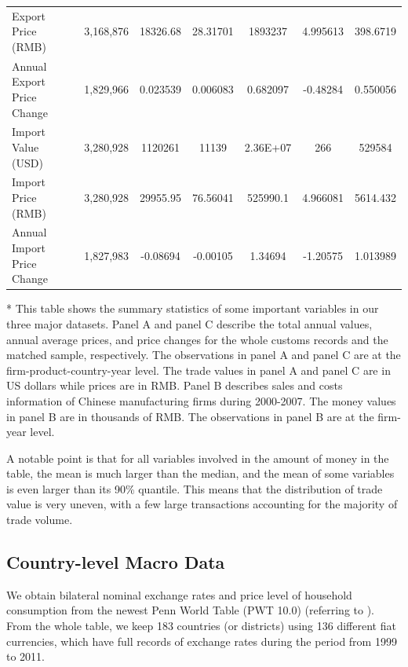 \documentclass[12pt]{article}
\begin{document}
\begin{table}[htbp]
{\begin{threeparttable}
\begin{tabular}{lcccccc}
		Export Price (RMB) & 3,168,876 & 18326.68 & 28.31701 & 1893237 & 4.995613 & 398.6719 \\
		Annual Export Price Change & 1,829,966 & 0.023539 & 0.006083 & 0.682097 & -0.48284 & 0.550056 \\
		Import Value (USD) & 3,280,928 & 1120261 & 11139 & 2.36E+07 & 266   & 529584 \\
		Import Price (RMB) & 3,280,928 & 29955.95 & 76.56041 & 525990.1 & 4.966081 & 5614.432 \\
		Annual Import Price Change  & 1,827,983 & -0.08694 & -0.00105 & 1.34694 & -1.20575 & 1.013989 \\
		\bottomrule
	\end{tabular}
	\begin{tablenotes}
		\footnotesize
		\item[*] This table shows the summary statistics of some important variables in our three major datasets. Panel A and panel C describe the total annual values, annual average prices, and price changes for the whole customs records and the matched sample, respectively. The observations in panel A and panel C are at the firm-product-country-year level. The trade values in panel A and panel C are in US dollars while prices are in RMB. Panel B describes sales and costs information of Chinese manufacturing firms during 2000-2007. The money values in panel B are in thousands of RMB. The observations in panel B are at the firm-year level.
	\end{tablenotes}
	\end{threeparttable}
        }
\end{table}

A notable point is that for all variables involved in the amount of money in the table, the mean is much larger than the median, and the mean of some variables is even larger than its 90\% quantile. This means that the distribution of trade value is very uneven, with a few large transactions accounting for the majority of trade volume.

\subsection{Country-level Macro Data} \label{Data-Macro}

We obtain bilateral nominal exchange rates and price level of household consumption from the newest Penn World Table (PWT 10.0) (referring to \cite{feenstra2015}). From the whole table, we keep 183 countries (or districts) using 136 different fiat currencies, which have full records of exchange rates during the period from 1999 to 2011. 
\end{document}
